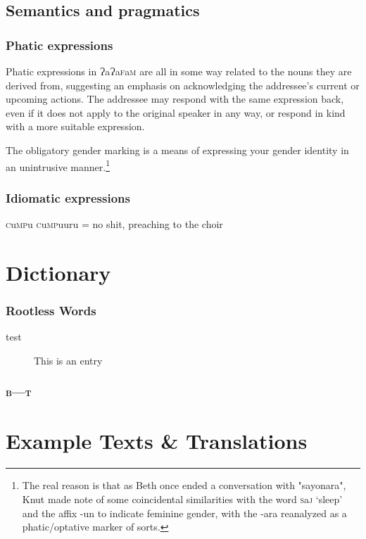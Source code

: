 \documentclass[a4paper,10pt,twoside,openright]{memoir}
\newcommand{\lang}{ɁaɁa\textsc{f}a\textsc{m}}
\begin{document}
\chapter{Semantics and pragmatics}
\section{Phatic expressions}

Phatic expressions in \lang{} are all in some way related to the nouns they are derived from, suggesting an emphasis on acknowledging the addressee's current or upcoming actions. The addressee may respond with the same expression back, even if it does not apply to the original speaker in any way, or respond in kind with a more suitable expression.

The obligatory gender marking is a means of expressing your gender identity in an unintrusive manner.\footnote{The real reason is that as Beth once ended a conversation with "sayonara", Knut made note of some coincidental similarities with the word \textsc{s}a\textsc{j} `sleep' and the affix -un to indicate feminine gender, with the -ara reanalyzed as a phatic/optative marker of sorts.}

\section{Idiomatic expressions}

\textsc{c}u\textsc{mp}u \textsc{c}u\textsc{mp}uuru = no shit, preaching to the choir

\part{Dictionary}


\begin{multicols}{2}
%
\section{Rootless Words}
\begin{description}
    \item[test] This is an entry
\end{description}

\section{\textsc{b---t}}



\end{multicols}

\part{Example Texts \& Translations}

\end{document}
